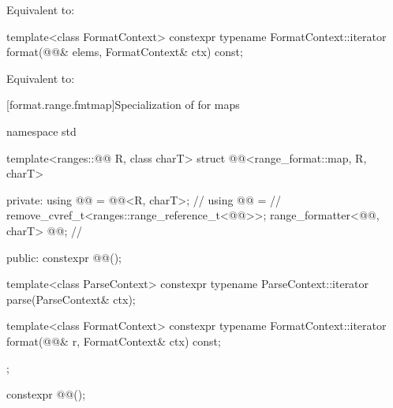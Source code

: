 \begin{itemdescr}
\pnum
\effects
Equivalent to: 
\end{itemdescr}

%
\begin{itemdecl}
template<class FormatContext>
  constexpr typename FormatContext::iterator
    format(@@& elems, FormatContext& ctx) const;
\end{itemdecl}

\begin{itemdescr}
\pnum
\effects
Equivalent to: 
\end{itemdescr}

[format.range.fmtmap]{Specialization of  for maps}

%
\begin{codeblock}
namespace std {
  template<ranges::@@ R, class charT>
  struct @@<range_format::map, R, charT> {
  private:
    using @@ = @@<R, charT>;                  // \expos
    using @@ =                                                // \expos
      remove_cvref_t<ranges::range_reference_t<@@>>;
    range_formatter<@@, charT> @@;                   // \expos

  public:
    constexpr @@();

    template<class ParseContext>
      constexpr typename ParseContext::iterator
        parse(ParseContext& ctx);

    template<class FormatContext>
      constexpr typename FormatContext::iterator
        format(@@& r, FormatContext& ctx) const;
  };
}
\end{codeblock}

%
\begin{itemdecl}
constexpr @@();
\end{itemdecl}

